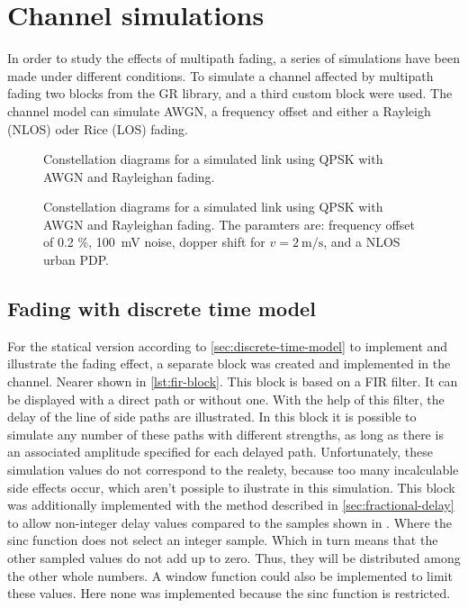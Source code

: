 \section{Channel simulations}

In order to study the effects of multipath fading, a series of simulations have been made under different conditions. To simulate a channel affected by multipath fading two blocks from the GR library, and a third custom block were used. The channel model can simulate AWGN, a frequency offset and either a Rayleigh (NLOS) oder Rice (LOS) fading.

\begin{figure}
	\centering
	
	\caption{
		Constellation diagrams for a simulated link using QPSK with AWGN and Rayleighan fading.
	}
\end{figure}

\begin{figure}
	\centering
	
	\caption{
		Constellation diagrams for a simulated link using QPSK with AWGN and Rayleighan fading. The paramters are: frequency offset of 0.2 \%, \SI{100}{\milli\volt} noise, dopper shift for \(v = \SI{2}{\meter\per\second}\), and a NLOS urban PDP.
	}
\end{figure}

\subsection{Fading with discrete time model}

For the statical version according to \ref{sec:discrete-time-model} to implement and illustrate the fading effect, a separate block was created and implemented in the channel. Nearer shown in \ref{lst:fir-block}. This block is based on a FIR filter. It can be displayed with a direct path or without one. With the help of this filter, the delay of the line of side paths are illustrated. In this block it is possible to simulate any number of these paths with different strengths, as long as there is an associated amplitude specified for each delayed path. Unfortunately, these simulation values do not correspond to the realety, because too many incalculable side effects occur, which aren't possiple to ilustrate in this simulation.
This block was additionally implemented with the method described in \ref{sec:fractional-delay} to allow non-integer delay values compared to the samples shown in . Where the sinc function does not select an integer sample. Which in turn means that the other sampled values do not add up to zero.
Thus, they will be distributed among the other whole numbers. A window function could also be implemented to limit these values. Here none was implemented because the sinc function is restricted.


